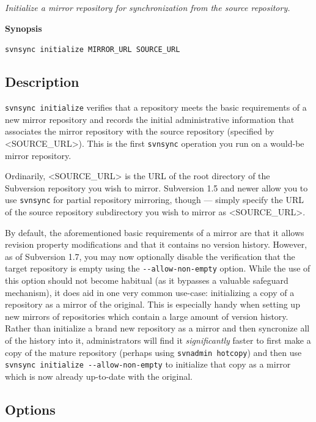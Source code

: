 \emph{Initialize a mirror repository for synchronization from the source
repository.}

\textbf{Synopsis}

\texttt{svnsync\ initialize\ MIRROR\_URL\ SOURCE\_URL}

\subsection{Description}

\texttt{svnsync\ initialize} verifies that a repository meets the basic
requirements of a new mirror repository and records the initial
administrative information that associates the mirror repository with
the source repository (specified by \textless SOURCE\_URL\textgreater).
This is the first \texttt{svnsync} operation you run on a would-be
mirror repository.

Ordinarily, \textless SOURCE\_URL\textgreater{} is the URL of the root
directory of the Subversion repository you wish to mirror. Subversion
1.5 and newer allow you to use \texttt{svnsync} for partial repository
mirroring, though --- simply specify the URL of the source repository
subdirectory you wish to mirror as \textless SOURCE\_URL\textgreater.

By default, the aforementioned basic requirements of a mirror are that
it allows revision property modifications and that it contains no
version history. However, as of Subversion 1.7, you may now optionally
disable the verification that the target repository is empty using the
\texttt{-\/-allow-non-empty} option. While the use of this option should
not become habitual (as it bypasses a valuable safeguard mechanism), it
does aid in one very common use-case: initializing a copy of a
repository as a mirror of the original. This is especially handy when
setting up new mirrors of repositories which contain a large amount of
version history. Rather than initialize a brand new repository as a
mirror and then syncronize all of the history into it, administrators
will find it \emph{significantly} faster to first make a copy of the
mature repository (perhaps using \texttt{svnadmin\ hotcopy}) and then
use \texttt{svnsync\ initialize\ -\/-allow-non-empty} to initialize that
copy as a mirror which is now already up-to-date with the original.

\subsection{Options}

